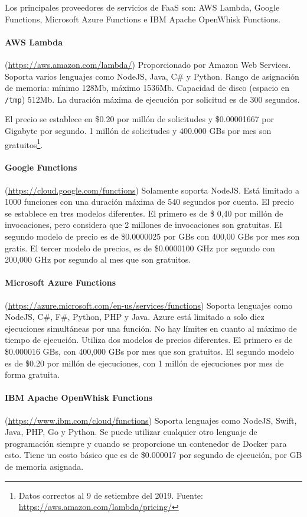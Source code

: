Los principales proveedores de servicios de FaaS son: AWS Lambda, Google Functions, Microsoft Azure Functions e IBM Apache OpenWhisk Functions\cite{novkovic-nemanja}.

\paragraph{AWS Lambda} (\url{https://aws.amazon.com/lambda/}) Proporcionado por Amazon Web Services. Soporta varios lenguajes como NodeJS, Java, C\# y Python. Rango de asignación de memoria: mínimo 128Mb, máximo 1536Mb. Capacidad de disco (espacio en \texttt{/tmp}) 512Mb. La duración máxima de ejecución por solicitud es de 300 segundos.

El precio se establece en \$0.20 por millón de solicitudes y \$0.00001667 por Gigabyte por segundo. 1 millón de solicitudes y 400.000 GBs por mes son gratuitos\footnote{Datos correctos al 9 de setiembre del 2019. Fuente: \url{https://aws.amazon.com/lambda/pricing/}}.

\paragraph{Google Functions} (\url{https://cloud.google.com/functions}) Solamente soporta NodeJS. Está limitado a 1000 funciones con una duración máxima de 540 segundos por cuenta. 
El precio se establece en tres modelos diferentes. El primero es de \$ 0,40 por millón de invocaciones, pero considera que 2 millones de invocaciones son gratuitas. El segundo modelo de precio es de \$0.0000025 por GBs con 400,00 GBs por mes son gratis. El tercer modelo de precios, es de \$0.0000100 GHz por segundo con 200,000 GHz por segundo al mes que son gratuitos.

\paragraph{Microsoft Azure Functions} (\url{https://azure.microsoft.com/en-us/services/functions}) Soporta lenguajes como NodeJS, C\#, F\#, Python, PHP y Java. Azure está limitado a solo diez ejecuciones simultáneas por una función. No hay límites en cuanto al máximo de tiempo de ejecución. Utiliza dos modelos de precios diferentes. El primero es de \$0.000016 GBs, con 400,000 GBs por mes que son gratuitos. El segundo modelo es de \$0.20 por millón de ejecuciones, con 1 millón de ejecuciones por mes de forma gratuita.

\paragraph{IBM Apache OpenWhisk Functions} (\url{https://www.ibm.com/cloud/functions}) Soporta lenguajes como NodeJS, Swift, Java, PHP, Go y Python. Se puede utilizar cualquier otro lenguaje de programación siempre y cuando se proporcione un contenedor de Docker para esto. Tiene un costo básico que es de \$0.000017 por segundo de ejecución, por GB de memoria asignada.

